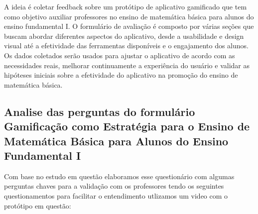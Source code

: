 A ideia é coletar feedback sobre um protótipo de aplicativo gamificado que tem como objetivo auxiliar professores no ensino de matemática básica para alunos do ensino fundamental I. O formulário de avaliação é composto por várias seções que buscam abordar diferentes aspectos do aplicativo, desde a usabilidade e design visual até a efetividade das ferramentas disponíveis e o engajamento dos alunos. Os dados coletados serão usados para ajustar o aplicativo de acordo com as necessidades reais, melhorar continuamente a experiência do usuário e validar as hipóteses iniciais sobre a efetividade do aplicativo na promoção do ensino de matemática básica. 

\subsection{Analise das perguntas do formulário Gamificação como Estratégia para o Ensino de Matemática Básica para Alunos do Ensino Fundamental I}

Com base no estudo em questão elaboramos esse questionário com algumas perguntas chaves para a validação com os professores tendo os seguintes questionamentos para facilitar o entendimento utlizamos um video com o protótipo em questão: 


